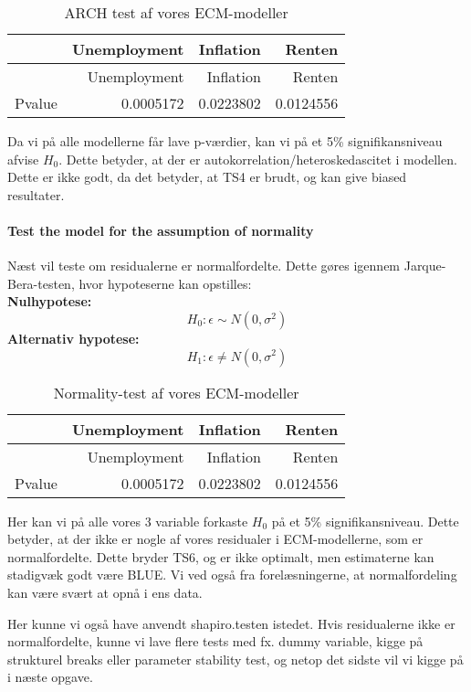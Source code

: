 \documentclass[
  10pt,
]{article}
\begin{document}
\begin{longtable}[]{@{}lrrr@{}}
\caption{ARCH test af vores ECM-modeller}\tabularnewline
\toprule
& Unemployment & Inflation & Renten\tabularnewline
\midrule
\endfirsthead
\toprule
& Unemployment & Inflation & Renten\tabularnewline
\midrule
\endhead
Pvalue & 0.0005172 & 0.0223802 & 0.0124556\tabularnewline
\bottomrule
\end{longtable}

Da vi på alle modellerne får lave p-værdier, kan vi på et 5\%
signifikansniveau afvise \(H_0\). Dette betyder, at der er
autokorrelation/heteroskedascitet i modellen. Dette er ikke godt, da det
betyder, at TS4 er brudt, og kan give biased resultater.

\hypertarget{test-the-model-for-the-assumption-of-normality}{%
\paragraph{Test the model for the assumption of
normality}\label{test-the-model-for-the-assumption-of-normality}}

\leavevmode

Næst vil teste om residualerne er normalfordelte. Dette gøres igennem
Jarque-Bera-testen, hvor hypoteserne kan opstilles:\\
\textbf{Nulhypotese:}
\[ H_0:\epsilon \sim N(0,\sigma^2) \tag{Residualer er normalfordelte}   \]
\textbf{Alternativ hypotese:}
\[ H_1:\epsilon \neq N(0,\sigma^2) \tag{Residualerne er ikke normalfordelte} \]

\begin{longtable}[]{@{}lrrr@{}}
\caption{Normality-test af vores ECM-modeller}\tabularnewline
\toprule
& Unemployment & Inflation & Renten\tabularnewline
\midrule
\endfirsthead
\toprule
& Unemployment & Inflation & Renten\tabularnewline
\midrule
\endhead
Pvalue & 0.0005172 & 0.0223802 & 0.0124556\tabularnewline
\bottomrule
\end{longtable}

Her kan vi på alle vores 3 variable forkaste \(H_0\) på et 5\%
signifikansniveau. Dette betyder, at der ikke er nogle af vores
residualer i ECM-modellerne, som er normalfordelte. Dette bryder TS6, og
er ikke optimalt, men estimaterne kan stadigvæk godt være BLUE. Vi ved
også fra forelæsningerne, at normalfordeling kan være svært at opnå i
ens data.

Her kunne vi også have anvendt shapiro.testen istedet. Hvis residualerne
ikke er normalfordelte, kunne vi lave flere tests med fx. dummy
variable, kigge på strukturel breaks eller parameter stability test, og
netop det sidste vil vi kigge på i næste opgave.
\end{document}
